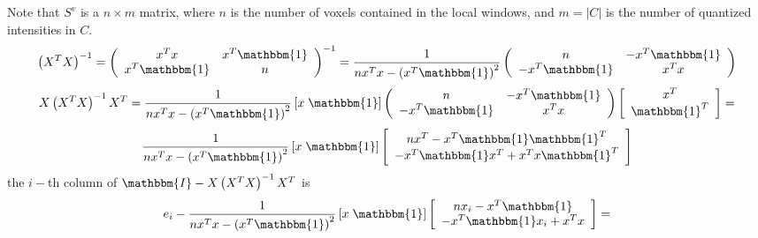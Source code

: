 Note that $S^{v}$ is a $n\times m$ matrix, where $n$ is the number of voxels contained in the local windows, and $m=|C|$ is the number of quantized intensities in $C$.
\begin{equation}
    \left(X^{T}X\right)^{-1} =
        \left(\begin{array}{cc}
            x^{T}x & x^{T}\mathbbm{1}\\
            x^{T}\mathbbm{1} & n\\
        \end{array}\right)^{-1} =
        \frac{1}{n x^{T}x - \left(x^{T}\mathbbm{1}\right)^{2}}
        \left(\begin{array}{cc}
            n & -x^{T}\mathbbm{1}\\
            -x^{T}\mathbbm{1} & x^{T}x
        \end{array}\right)
\end{equation}
\begin{equation}
    X\left(X^{T}X\right)^{-1}X^{T} =
        \frac{1}{n x^{T}x - \left(x^{T}\mathbbm{1}\right)^{2}}
        \left[x \; \mathbbm{1}\right]\left(\begin{array}{cc}
            n & -x^{T}\mathbbm{1}\\
            -x^{T}\mathbbm{1} & x^{T}x
        \end{array}\right)
        \left[\begin{array}{c}
            x^{T}\\
            \mathbbm{1}^{T}
        \end{array}\right]=
\end{equation}
\begin{equation}
        \frac{1}{n x^{T}x - \left(x^{T}\mathbbm{1}\right)^{2}}
        \left[x \; \mathbbm{1}\right]
        \left[\begin{array}{c}
            n x^{T} - x^{T}\mathbbm{1}\mathbbm{1}^{T}\\
            -x^{T}\mathbbm{1}x^{T} + x^{T}x\mathbbm{1}^{T}
        \end{array}\right]
\end{equation}
the $i-$th column of $\mathbbm{I} - X\left(X^{T}X\right)^{-1}X^{T}$ is
\begin{equation}
        e_{i} - \frac{1}{n x^{T}x - \left(x^{T}\mathbbm{1}\right)^{2}}
        \left[x \; \mathbbm{1}\right]
        \left[\begin{array}{c}
            n x_{i} - x^{T}\mathbbm{1}\\
            -x^{T}\mathbbm{1}x_{i} + x^{T}x
        \end{array}\right]=
\end{equation}
